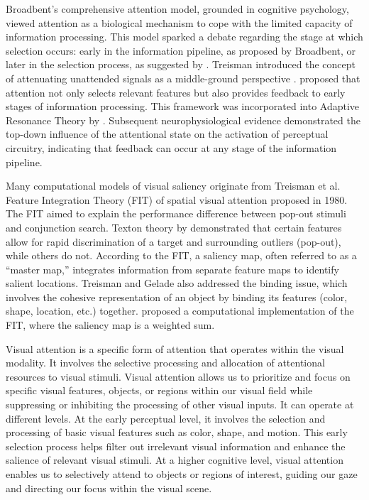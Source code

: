 Broadbent's comprehensive attention model, grounded in cognitive psychology, viewed attention as a biological mechanism to cope with the limited capacity of information processing. This model sparked a debate regarding the stage at which selection occurs: early in the information pipeline, as proposed by Broadbent, or later in the selection process, as suggested by \citet{norman1968toward}. Treisman introduced the concept of attenuating unattended signals as a middle-ground perspective \citep{treisman1980feature}. \citet{milner1974model} proposed that attention not only selects relevant features but also provides feedback to early stages of information processing. This framework was incorporated into Adaptive Resonance Theory by \citet{grossberg1975neural}. Subsequent neurophysiological evidence demonstrated the top-down influence of the attentional state on the activation of perceptual circuitry, indicating that feedback can occur at any stage of the information pipeline.


Many computational models of visual saliency originate from Treisman et al. Feature Integration Theory (FIT) of spatial visual attention proposed in 1980. The FIT aimed to explain the performance difference between pop-out stimuli and conjunction search. Texton theory by \citet{bergen1983parallel} demonstrated that certain features allow for rapid discrimination of a target and surrounding outliers (pop-out), while others do not. According to the FIT, a saliency map, often referred to as a ``master map,'' integrates information from separate feature maps to identify salient locations. Treisman and Gelade also addressed the binding issue, which involves the cohesive representation of an object by binding its features (color, shape, location, etc.) together. \citet{koch1987shifts} proposed a computational implementation of the FIT, where the saliency map is a weighted sum.


Visual attention is a specific form of attention that operates within the visual modality. It involves the selective processing and allocation of attentional resources to visual stimuli. Visual attention allows us to prioritize and focus on specific visual features, objects, or regions within our visual field while suppressing or inhibiting the processing of other visual inputs. It can operate at different levels. At the early perceptual level, it involves the selection and processing of basic visual features such as color, shape, and motion. This early selection process helps filter out irrelevant visual information and enhance the salience of relevant visual stimuli. At a higher cognitive level, visual attention enables us to selectively attend to objects or regions of interest, guiding our gaze and directing our focus within the visual scene.

